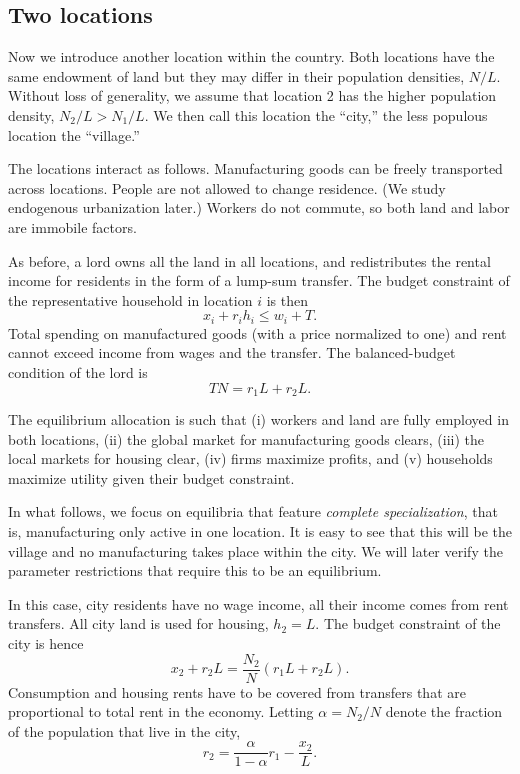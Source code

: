 \documentclass[12pt]{article}
\begin{document}
\subsection{Two locations}
Now we introduce another location within the country. Both  locations have the same endowment of land but they may differ in their population densities, $N/L$. Without loss of generality, we assume that location 2 has the higher population density, $N_2/L>N_1/L$. We then call this location the ``city,'' the less populous location the ``village.''

The locations interact as follows. Manufacturing goods can be freely transported across locations. People are not allowed to change residence. (We study endogenous urbanization later.) Workers do not commute, so both land and labor are immobile factors.

As before, a lord owns all the land in all locations, and redistributes the rental income for residents in the form of a lump-sum transfer. The budget constraint of the representative household in location $i$ is then
\[
x_i + r_i h_i \le w_i + T.
\]
Total spending on manufactured goods (with a price normalized to one) and rent cannot exceed income from wages and the transfer. The balanced-budget condition of the lord is
\[
TN = r_1L+r_2L.
\]

The equilibrium allocation is such that (i) workers and land are fully employed in both locations, (ii) the global market for manufacturing goods clears, (iii) the local markets for housing clear, (iv) firms maximize profits, and (v) households maximize utility given their budget constraint.

In what follows, we focus on equilibria that feature \emph{complete specialization}, that is, manufacturing only active in one location. It is easy to see that this will be the village and no manufacturing takes place within the city. We will later verify the parameter restrictions that require this to be an equilibrium.

In this case, city residents have no wage income, all their income comes from rent transfers. All city land is used for housing, $h_2=L$. The budget constraint of the city is hence
\[
x_2+r_2L = \frac{N_2}{N}(r_1L+r_2L).
\]
Consumption and housing rents have to be covered from transfers that are proportional to total rent in the economy. Letting $\alpha=N_2/N$ denote the fraction of the population that live in the city,
\[
r_2 = \frac{\alpha}{1-\alpha}r_1 -\frac{x_2}{L}.
\]
\end{document}
